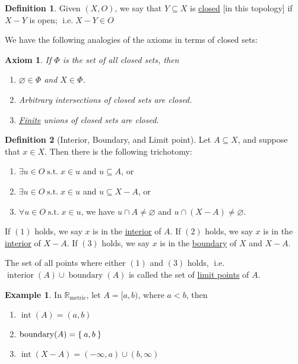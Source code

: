 \documentclass[12pt]{amsart}
\newcommand{\bbR}{\mathbb{R}}
\newcommand{\suchthat}{\operatorname{s.t.}}
\newcommand{\ie}{\operatorname{i.e.}}
\theoremstyle{plain}
\newtheorem*{axm}{Axiom}
\theoremstyle{remark}
\theoremstyle{definition}
\newtheorem*{define}{Definition}
\newtheorem*{eg}{Example}
\begin{document}
	\begin{define}
		Given $(X, O)$, we say that $Y \subseteq X$ is \ul{closed} [in this topology] if $X - Y$ is open; $\ie X - Y \in O$ 
	\end{define}

	We have the following analogies of the axioms in terms of closed sets: 
	
	\begin{axm}
		If $\Phi$ is the set of all closed sets, then
		\begin{enumerate}[(1)]
			\item $\varnothing \in \Phi$ and $X \in \Phi$.
			\item Arbitrary intersections of closed sets are closed.
			\item \ul{Finite} unions of closed sets are closed.
		\end{enumerate}
	\end{axm}

	\begin{define}[Interior, Boundary, and Limit point]
Let $A \subseteq X$, and suppose that $x \in X$. Then there is the following trichotomy:
\begin{enumerate}[(1)]
	\item $\exists u \in O \suchthat x \in u $ and $u \subseteq A$, or
	\item $\exists u \in O \suchthat x \in u $ and $u \subseteq X - A$, or
	\item $\forall u \in O \suchthat x \in u $, we have $u \cap A \neq \varnothing$ and $u \cap (X - A) \neq \varnothing$.
\end{enumerate}
If $(1)$ holds, we say $x$ is in the \ul{interior} of $A$.
\newline
If $(2)$ holds, we say $x$ is in the \ul{interior} of $X - A$.
\newline
If $(3)$ holds, we say $x$ is in the \ul{boundary} of $X$ and $X - A$.
\newline

The set of all points where either $(1)$ and $(3)$ holds, $\ie$ $\operatorname{interior}(A) \cup \operatorname{boundary}(A)$ is called the set of \ul{limit points} of $A$.
\end{define}
\begin{eg}
	In $\bbR_{\text{metric}}$, let $A = [a, b)$, where $a < b$, then
	\begin{enumerate}
		\item $\operatorname{int}(A) = (a, b)$
		\item $\operatorname{boundary}(A) = \Set{a, b}$
		\item $\operatorname{int}(X-A) = (-\infty, a) \cup (b, \infty)$
	\end{enumerate}
\end{eg}
\end{document}
